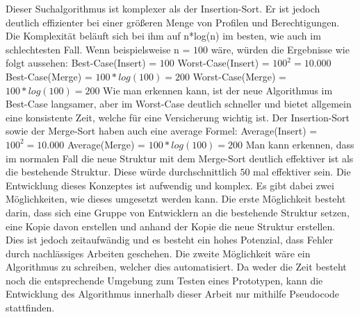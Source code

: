 Dieser Suchalgorithmus ist komplexer als der Insertion-Sort. Er ist jedoch deutlich effizienter bei einer größeren Menge von Profilen und Berechtigungen.
Die Komplexität beläuft sich bei ihm auf n*log(n) im besten, wie auch im schlechtesten Fall. \cite[12]{log} \cite{weblogMer}
\newline
Wenn beispielsweise n = $100$ wäre, würden die Ergebnisse wie folgt aussehen:
\newline
\newline
Best-Case(Insert) = $100$
\newline
Worst-Case(Insert) = $100^2 = 10.000$
\newline
\newline
Best-Case(Merge) = $100*log(100) = 200$
\newline
Worst-Case(Merge) = $100*log(100) = 200$
\newline
\newline
Wie man erkennen kann, ist der neue Algorithmus im Best-Case langsamer, aber im Worst-Case deutlich schneller und bietet allgemein eine konsistente Zeit, welche für eine Versicherung wichtig ist.
Der Insertion-Sort sowie der Merge-Sort haben auch eine average Formel: \cite{weblogMer,weblogIn}
\newline
\newline
Average(Insert) = $100^2 = 10.000$
\newline
\newline
Average(Merge) = $100*log(100) = 200$
\newline
\newline
Man kann erkennen, dass im normalen Fall die neue Struktur mit dem Merge-Sort deutlich effektiver ist als die bestehende Struktur.
Diese würde durchschnittlich $50$ mal effektiver sein.
\newline
\newline
Die Entwicklung dieses Konzeptes ist aufwendig und komplex.
Es gibt dabei zwei Möglichkeiten, wie dieses umgesetzt werden kann.
Die erste Möglichkeit besteht darin, dass sich eine Gruppe von Entwicklern an die bestehende Struktur setzen, eine Kopie davon erstellen und anhand der Kopie die neue Struktur erstellen.
Dies ist jedoch zeitaufwändig und es besteht ein hohes Potenzial, dass Fehler durch nachlässiges Arbeiten geschehen.
\newline
Die zweite Möglichkeit wäre ein Algorithmus zu schreiben, welcher dies automatisiert.
Da weder die Zeit besteht noch die entsprechende Umgebung zum Testen eines Prototypen, kann die Entwicklung des Algorithmus innerhalb dieser Arbeit nur mithilfe Pseudocode stattfinden.
